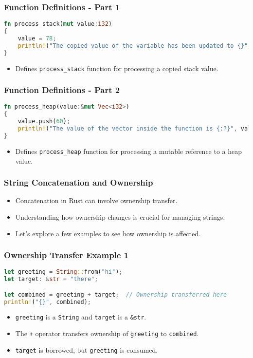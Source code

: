 \documentclass[aspectratio=169, table]{beamer}
\begin{document}
\begin{frame}[fragile]
\frametitle{Function Definitions - Part 1}
\begin{lstlisting}[language=Rust]
fn process_stack(mut value:i32)    
{   
	value = 78; 
	println!("The copied value of the variable has been updated to {}", value); 
}
\end{lstlisting}
\begin{itemize}
\item Defines \texttt{process\_stack} function for processing a copied stack value.
\end{itemize}
\end{frame}

\begin{frame}[fragile]
\frametitle{Function Definitions - Part 2}
\begin{lstlisting}[language=Rust]
fn process_heap(value:&mut Vec<i32>)    
{
	value.push(60);    
	println!("The value of the vector inside the function is {:?}", value); 
}
\end{lstlisting}
\begin{itemize}
\item Defines \texttt{process\_heap} function for processing a mutable reference to a heap value.
\end{itemize}
\end{frame}


\begin{frame}[fragile]
\frametitle{String Concatenation and Ownership}
\begin{itemize}
\item Concatenation in Rust can involve ownership transfer.
\item Understanding how ownership changes is crucial for managing strings.
\item Let's explore a few examples to see how ownership is affected.
\end{itemize}
\end{frame}

\begin{frame}[fragile]
\frametitle{Ownership Transfer Example 1}
\begin{lstlisting}[language=Rust]
let greeting = String::from("hi"); 
let target: &str = "there";

let combined = greeting + target;  // Ownership transferred here
println!("{}", combined);
\end{lstlisting}
\begin{itemize}
\item \texttt{greeting} is a \texttt{String} and \texttt{target} is a \texttt{\&str}.
\item The \texttt{+} operator transfers ownership of \texttt{greeting} to \texttt{combined}.
\item \texttt{target} is borrowed, but \texttt{greeting} is consumed.
\end{itemize}
\end{frame}
\end{document}
